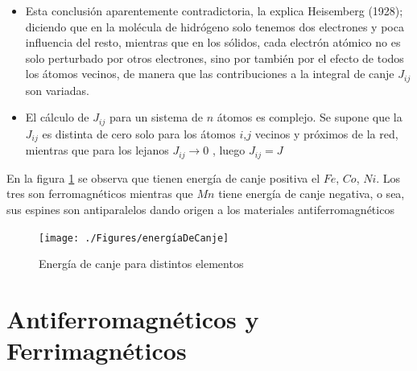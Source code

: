 \begin{itemize}
	\item Esta conclusión aparentemente contradictoria, la explica Heisemberg (1928); diciendo que en la molécula de hidrógeno solo tenemos dos electrones y poca influencia del resto, mientras que en los sólidos, cada electrón atómico no es solo perturbado por otros electrones, sino por también por el efecto de todos los átomos vecinos, de manera que las contribuciones a la integral de canje $J_{ij}$ son variadas.

	\item El cálculo de $J_{ij}$ para un sistema de $n$ átomos es complejo. Se supone que la $J_{ij}$ es distinta de cero solo para los átomos $i$,$j$  vecinos y próximos de la red, mientras que para los lejanos $J_{ij}\rightarrow0$ , luego $J_{ij}=J$ 
 	
\end{itemize}

En la figura \ref{fig:energíaDeCanje} se observa que tienen energía de canje positiva el $Fe$, $Co$, $Ni$. Los tres son ferromagnéticos mientras que $Mn$ tiene energía de canje negativa, o sea, sus espines son antiparalelos dando origen a los materiales antiferromagnéticos


\begin{figure}[H]
    \centering
    \texttt{[image: ./Figures/energíaDeCanje]}
	\caption{Energía de canje para distintos elementos}
	\label{fig:energíaDeCanje}
\end{figure}

\section{Antiferromagnéticos y Ferrimagnéticos}

